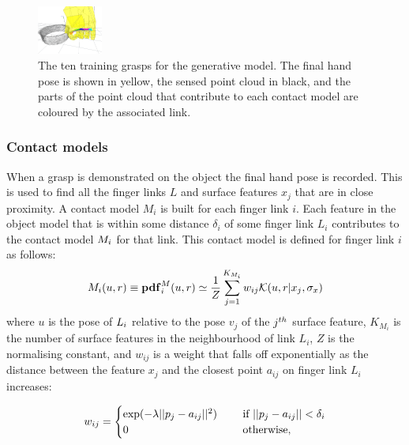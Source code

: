 \begin{figure}[t]
\includegraphics[width=0.19\textwidth]{images/contact-viewall10}
\caption{The ten training grasps for the generative model. The final hand pose is shown in yellow, the sensed point cloud in black, and the parts of the point cloud that contribute to each contact model are coloured by the associated link. \label{fig:generative-training}}
\end{figure}
\subsubsection{Contact models}
When a grasp is demonstrated on the object the final hand pose is recorded. This is used to find all the finger links $L$ and surface features $x_j$ that are in close proximity. A contact model $M_i$ is built for each finger link $i$. Each feature in the object model that is within some distance $\delta_i$ of some finger link $L_i$ contributes to the contact model $M_i$ for that link. This contact model is defined for finger link $i$ as follows:
\begin{equation}
\cm_i(u, r) \equiv \pdf^\cm_i(u, r) \simeq \frac{1}{Z} \sum_{j=1}^{K_{M_i}} w_{ij} \mathcal{K}(u, r | {x_j}, \sigma_{x})
\label{eq:cm}
\end{equation}
where $u$ is the pose of $L_i$ relative to the pose $v_j$ of the $j^{\mathnormal{th}}$ surface feature, $K_{M_i}$ is the number of surface features in the neighbourhood of link $L_i$, $Z$ is the normalising constant, and $w_{ij}$ is a weight that falls off exponentially as the distance between the feature $x_j$ and the closest point $a_{ij}$ on finger link $L_i$ increases:

\begin{equation}
w_{ij} = \begin{cases}\exp(-\lambda ||p_j-a_{ij}||^2) \quad &\textnormal{ if } ||p_j-a_{ij}|| < \delta_i\\
0 \quad &\textnormal{ otherwise},\end{cases}
\label{eq:learning.modeldist.wgh}
\end{equation}

